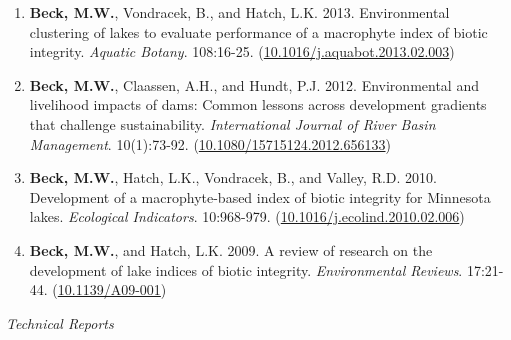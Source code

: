 \documentclass[letterpaper,12pt]{article}
\begin{document}
\begin{enumerate}
\item \textbf{Beck, M.W.}, Vondracek, B., and Hatch, L.K. 2013. Environmental clustering of lakes to evaluate performance of a macrophyte index of biotic integrity. \textit{Aquatic Botany}. 108:16-25. ({\footnotesize\href{https://doi.org/10.1016/j.aquabot.2013.02.003}{10.1016/j.aquabot.2013.02.003}})

\item \textbf{Beck, M.W.}, Claassen, A.H., and Hundt, P.J. 2012. Environmental and livelihood impacts of dams: Common lessons across development gradients that challenge sustainability. \textit{International Journal of River Basin Management}. 10(1):73-92. ({\footnotesize\href{http://dx.doi.org/10.1080/15715124.2012.656133}{10.1080/15715124.2012.656133}})

\item \textbf{Beck, M.W.}, Hatch, L.K., Vondracek, B., and Valley, R.D. 2010. Development of a macrophyte-based index of biotic integrity for Minnesota lakes. \textit{Ecological Indicators}. 10:968-979. ({\footnotesize\href{https://doi.org/10.1016/j.ecolind.2010.02.006}{10.1016/j.ecolind.2010.02.006}})

\item \textbf{Beck, M.W.}, and Hatch, L.K. 2009. A review of research on the development of lake indices of biotic integrity. \textit{Environmental Reviews}. 17:21-44. ({\footnotesize\href{https://doi.org/10.1139/A09-001}{10.1139/A09-001}})

\end{enumerate}

\vspace{\baselineskip} 
\centerline{\large{\textit{Technical Reports}}}
\end{document}

